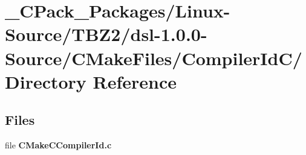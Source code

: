 \section{\_\-CPack\_\-Packages/Linux-\/Source/TBZ2/dsl-\/1.0.0-\/Source/CMakeFiles/CompilerIdC/ Directory Reference}
\label{dir_05cfe51f1c19b2eb45ffcf4943bc2ed6}
\subsection*{Files}
\begin{DoxyCompactItemize}
\item 
file {\bf CMakeCCompilerId.c}
\end{DoxyCompactItemize}
